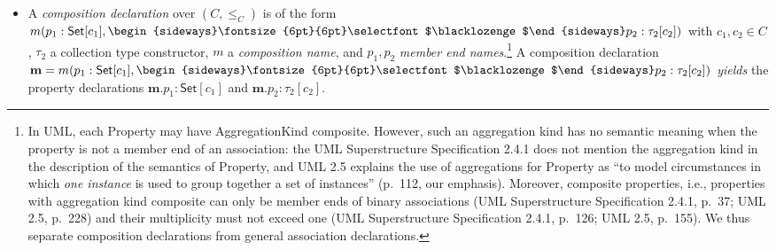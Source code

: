 \documentclass[10pt,fleqn,%
\ifpretendfinal
final%
\else
draft%
\fi,
]{scrreprt}
\newcommand{\uml}[1]{\textsf{#1}}
\newcommand{\composition}{\raisebox{0.2pt}{\begin{sideways}\fontsize{6pt}{6pt}\selectfont$\blacklozenge$\end{sideways}}}
\begin{document}
\begin{itemize}[label={--}, leftmargin=*]
  \item A \emph{composition declaration} over $(C, {\leq_C})$ is of the
form $m(p_1 : \mathsf{Set}[c_1], \composition p_2 : \tau_2[c_2])$ with
$c_1, c_2 \in C$, $\tau_2$ a collection type constructor, $m$ a
\emph{composition name}, and $p_1, p_2$ \emph{member end
  names}.\footnote{In UML, each \uml{Property} may have
  \uml{AggregationKind} \uml{composite}.  However, such an aggregation
  kind has no semantic meaning when the property is not a member end of
  an association: the UML Superstructure Specification 2.4.1 does not
  mention the aggregation kind in the description of the semantics of
  \uml{Property}, and UML 2.5 explains the use of aggregations for
  \uml{Property} as ``to model circumstances in which \emph{one
    instance} is used to group together a set of instances'' (p.~112,
  our emphasis).  Moreover, composite properties, i.e., properties with
  aggregation kind \uml{composite} can only be member ends of binary
  associations (UML Superstructure Specification 2.4.1, p.~37; UML 2.5,
  p.~228) and their multiplicity must not exceed one (UML Superstructure
  Specification 2.4.1, p.~126; UML 2.5, p.~155).  We thus separate
  composition declarations from general association declarations.}  A
composition declaration
$\mathbf{m} = m(p_1 : \mathsf{Set}[c_1], \composition p_2 :
\tau_2[c_2])$
\emph{yields} the property declarations
$\mathbf{m}.p_1 : \mathsf{Set}[c_1]$ and $\mathbf{m}.p_2 : \tau_2[c_2]$.
\end{itemize}
\end{document}
